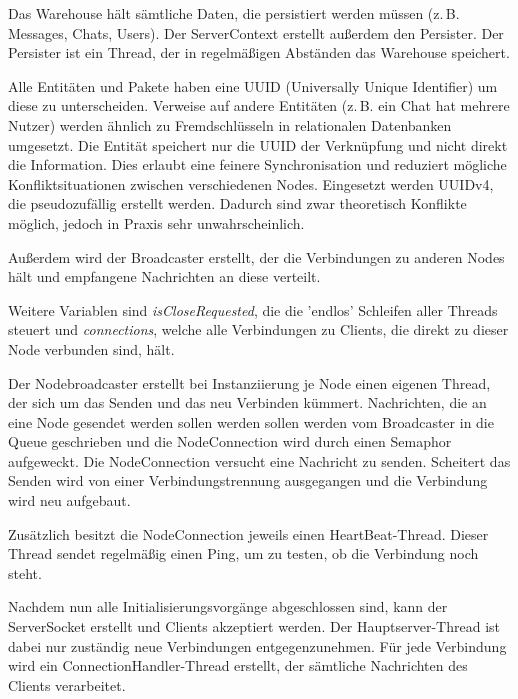 Das Warehouse hält sämtliche Daten, die persistiert werden müssen (z.\,B. Messages, Chats, Users). Der ServerContext erstellt außerdem den Persister. Der Persister ist ein Thread, der in regelmäßigen Abständen das Warehouse speichert.


Alle Entitäten und Pakete haben eine UUID (Universally Unique Identifier) um diese zu unterscheiden. Verweise auf andere Entitäten (z.\,B. ein Chat hat mehrere Nutzer) werden ähnlich zu Fremdschlüsseln in relationalen Datenbanken umgesetzt. Die Entität speichert nur die UUID der Verknüpfung und nicht direkt die Information. Dies erlaubt eine feinere Synchronisation und reduziert mögliche Konfliktsituationen zwischen verschiedenen Nodes. Eingesetzt werden UUIDv4, die pseudozufällig erstellt werden. Dadurch sind zwar theoretisch Konflikte möglich, jedoch in Praxis sehr unwahrscheinlich.

Außerdem wird der Broadcaster erstellt, der die Verbindungen zu anderen Nodes hält und empfangene Nachrichten an diese verteilt.




Weitere Variablen sind \textit{isCloseRequested}, die die 'endlos' Schleifen aller Threads steuert und \textit{connections}, welche alle Verbindungen zu Clients, die direkt zu dieser Node verbunden sind, hält.

Der Nodebroadcaster erstellt bei Instanziierung je Node einen eigenen Thread, der sich um das Senden und das neu Verbinden kümmert.
Nachrichten, die an eine Node gesendet werden sollen werden sollen werden vom Broadcaster in die Queue geschrieben und die NodeConnection wird durch einen Semaphor aufgeweckt. 
Die NodeConnection versucht eine Nachricht zu senden. Scheitert das Senden wird von einer Verbindungstrennung ausgegangen und die Verbindung wird neu aufgebaut.


Zusätzlich besitzt die NodeConnection jeweils einen HeartBeat-Thread. Dieser Thread sendet regelmäßig einen Ping, um zu testen, ob die Verbindung noch steht.


Nachdem nun alle Initialisierungsvorgänge abgeschlossen sind, kann der ServerSocket erstellt und Clients akzeptiert werden.
Der Hauptserver-Thread ist dabei nur zuständig neue Verbindungen entgegenzunehmen. Für jede Verbindung wird ein ConnectionHandler-Thread erstellt, der sämtliche Nachrichten des Clients verarbeitet.


